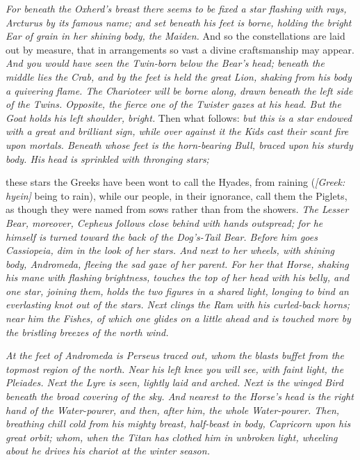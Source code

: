  \textit{For beneath the Oxherd's breast there seems to be fixed a star flashing with rays, Arcturus by its famous name; and set beneath his feet is borne, holding the bright Ear of grain in her shining body, the Maiden.} And so the constellations are laid out by measure, that in arrangements so vast a divine craftsmanship may appear. \textit{And you would have seen the Twin-born below the Bear's head; beneath the middle lies the Crab, and by the feet is held the great Lion, shaking from his body a quivering flame. The Charioteer will be borne along, drawn beneath the left side of the Twins. Opposite, the fierce one of the Twister gazes at his head. But the Goat holds his left shoulder, bright.} Then what follows: \textit{but this is a star endowed with a great and brilliant sign, while over against it the Kids cast their scant fire upon mortals. Beneath whose feet is the horn-bearing Bull, braced upon his sturdy body. His head is sprinkled with thronging stars;}

 these stars the Greeks have been wont to call the Hyades, from raining (\textit{[Greek: hyein]} being to rain), while our people, in their ignorance, call them the Piglets, as though they were named from sows rather than from the showers. \textit{The Lesser Bear, moreover, Cepheus follows close behind with hands outspread; for he himself is turned toward the back of the Dog's-Tail Bear. Before him goes Cassiopeia, dim in the look of her stars. And next to her wheels, with shining body, Andromeda, fleeing the sad gaze of her parent. For her that Horse, shaking his mane with flashing brightness, touches the top of her head with his belly, and one star, joining them, holds the two figures in a shared light, longing to bind an everlasting knot out of the stars. Next clings the Ram with his curled-back horns; near him the Fishes, of which one glides on a little ahead and is touched more by the bristling breezes of the north wind.}

 \textit{At the feet of Andromeda is Perseus traced out, whom the blasts buffet from the topmost region of the north. Near his left knee you will see, with faint light, the Pleiades. Next the Lyre is seen, lightly laid and arched. Next is the winged Bird beneath the broad covering of the sky. And nearest to the Horse's head is the right hand of the Water-pourer, and then, after him, the whole Water-pourer. Then, breathing chill cold from his mighty breast, half-beast in body, Capricorn upon his great orbit; whom, when the Titan has clothed him in unbroken light, wheeling about he drives his chariot at the winter season.}

